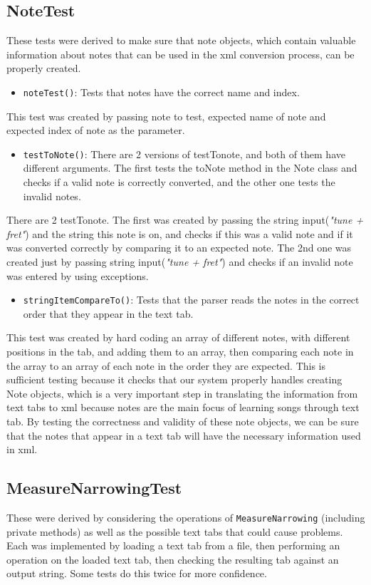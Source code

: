 \documentclass[11pt]{article}
\begin{document}
\subsection{NoteTest}
\label{sec:orge37f974}
These tests were derived to make sure that note objects, which contain valuable information about notes that can be used in the xml conversion process, can be properly created. 
\begin{itemize}
\item \texttt{noteTest()}: Tests that notes have the correct name and index.
\end{itemize}
This test was created by passing note to test, expected name of note and expected index of note as the parameter.
\begin{itemize}
\item \texttt{testToNote()}: There are 2 versions of testTonote, and both of them have different arguments. The first tests the toNote method in the Note class and checks if a valid note is correctly converted, and the other one tests the invalid notes.
\end{itemize}
There are 2 testTonote. The first was created by passing the string input(\emph{"tune + fret"}) and the string this note is on, and checks if this was a valid note and if it was converted correctly by comparing it to an expected note. The 2nd one was created just by passing string input(\emph{"tune + fret"}) and checks if an invalid note was entered by using exceptions.
\begin{itemize}
\item \texttt{stringItemCompareTo()}: Tests that the parser reads the notes in the correct order that they appear in the text tab.
\end{itemize}
This test was created by hard coding an array of different notes, with different positions in the tab, and adding them to an array, then comparing each note in the array to an array of each note in the order they are expected.
This is sufficient testing because it checks that our system properly handles creating Note objects, which is a very important step in translating the information from text tabs to xml because notes are the main focus of learning songs through text tab. By testing the correctness and validity of these note objects, we can be sure that the notes that appear in a text tab will have the necessary information used in xml.
\subsection{MeasureNarrowingTest}
\label{sec:orgc596157}
These were derived by considering the operations of \texttt{MeasureNarrowing} (including private methods) as well as the possible text tabs that could cause problems.
Each was implemented by loading a text tab from a file, then performing an operation on the loaded text tab, then checking the resulting tab against an output string.  Some tests do this twice for more confidence.
\end{document}

